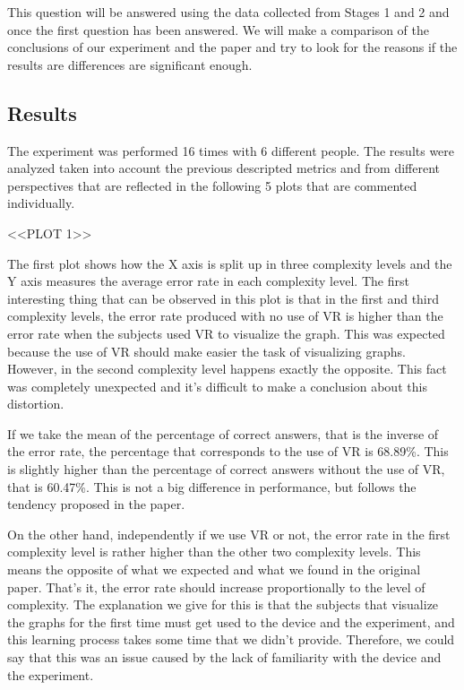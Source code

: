 This question will be answered using the data collected from Stages 1
and 2 and once the first question has been answered. We will make a
comparison of the conclusions of our experiment and the paper and try to
look for the reasons if the results are differences are significant
enough.

\subsection{Results}\label{results}

The experiment was performed 16 times with 6 different people. The
results were analyzed taken into account the previous descripted metrics
and from different perspectives that are reflected in the following 5
plots that are commented individually.

\textless{}\textless{}PLOT 1\textgreater{}\textgreater{}

The first plot shows how the X axis is split up in three complexity
levels and the Y axis measures the average error rate in each complexity
level. The first interesting thing that can be observed in this plot is
that in the first and third complexity levels, the error rate produced
with no use of VR is higher than the error rate when the subjects used
VR to visualize the graph. This was expected because the use of VR
should make easier the task of visualizing graphs. However, in the
second complexity level happens exactly the opposite. This fact was
completely unexpected and it's difficult to make a conclusion about this
distortion.

If we take the mean of the percentage of correct answers, that is the
inverse of the error rate, the percentage that corresponds to the use of
VR is 68.89\%. This is slightly higher than the percentage of correct
answers without the use of VR, that is 60.47\%. This is not a big
difference in performance, but follows the tendency proposed in the
paper.

\protect\hypertarget{transcription-of-the-thomas-talk-last-pr}{}{}On the
other hand, independently if we use VR or not, the error rate in the
first complexity level is rather higher than the other two complexity
levels. This means the opposite of what we expected and what we found in
the original paper. That's it, the error rate should increase
proportionally to the level of complexity. The explanation we give for
this is that the subjects that visualize the graphs for the first time
must get used to the device and the experiment, and this learning
process takes some time that we didn't provide. Therefore, we could say
that this was an issue caused by the lack of familiarity with the device
and the experiment.

